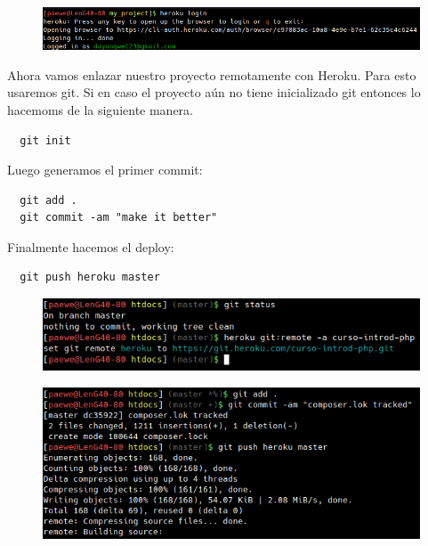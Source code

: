 \documentclass{article}
\begin{document}
\begin{figure}[h!]
  \centering
  \includegraphics[scale=0.5]{./Pictures/250_login_complete.png}
\end{figure}

Ahora vamos enlazar nuestro proyecto remotamente con Heroku. Para esto usaremos
git. Si en caso el proyecto aún no tiene inicializado git entonces lo hacemoms
de la siguiente manera.\\


\begin{verbatim}
  git init
\end{verbatim}

Luego generamos el primer commit:

\begin{verbatim}
  git add .
  git commit -am "make it better"
\end{verbatim}

Finalmente hacemos el deploy:

\begin{verbatim}
  git push heroku master
\end{verbatim}

\begin{figure}[h!]
  \centering
  \includegraphics[scale=0.5]{./Pictures/251_git_remote_heroku.png}
\end{figure}

\begin{figure}[h!]
  \centering
  \includegraphics[scale=0.5]{./Pictures/252_deploy_heroku.png}
\end{figure}
\end{document}
